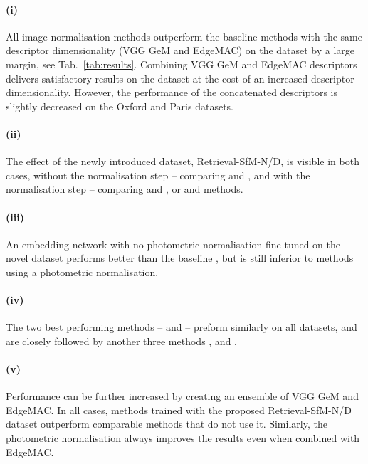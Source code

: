\paragraph{(i)} All image normalisation methods outperform the baseline methods with the same descriptor dimensionality (VGG GeM and EdgeMAC) on the \Tokyo dataset by a large margin, see Tab.~\ref{tab:results}. 
Combining VGG GeM and EdgeMAC descriptors delivers satisfactory results on the \Tokyo dataset at the cost of an increased descriptor dimensionality. However, the performance of the concatenated descriptors is slightly decreased on the Oxford and Paris datasets. 

\paragraph{(ii)} The effect of the newly introduced dataset, Retrieval-SfM-N/D, is visible in both cases, without the normalisation step -- comparing  and , and with the normalisation step -- comparing  and , or  and  methods.

\paragraph{(iii)} An embedding network with no photometric normalisation fine-tuned on the novel dataset  performs better than the baseline , but is still inferior to methods using a photometric normalisation.

\paragraph{(iv)} The two best performing methods --  and  -- preform similarly on all datasets, and are closely followed by another three methods ,  and .

\paragraph{(v)} Performance can be further increased by creating an ensemble of VGG GeM and EdgeMAC.
In all cases, methods trained with the proposed Retrieval-SfM-N/D dataset outperform comparable methods that do not use it. Similarly, the photometric normalisation always improves the results even when combined with EdgeMAC.

